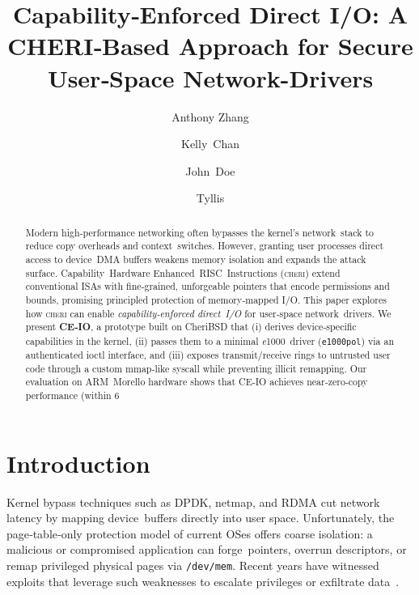 \documentclass[sigconf]{acmart}
\title{Capability‑Enforced Direct I/O: A CHERI‑Based Approach for Secure User‑Space Network-Drivers}
\author{Anthony Zhang}
\affiliation{\institution{Northwestern University}\country{USA}}
\author{Kelly Chan}
\affiliation{\institution{Northwestern University}\country{USA}}
\author{John Doe}
\affiliation{\institution{Northwestern University}\country{USA}}
\author{Tyllis}
\affiliation{\institution{Northwestern University}\country{USA}}
\newcommand{\cheri}{\textsc{cheri}\xspace}
\newcommand{\e}{\textit{e}1000\xspace}
\begin{document}
\begin{abstract}
Modern high‑performance networking often bypasses the kernel’s network stack to reduce copy overheads and context switches. However, granting user processes direct access to device DMA buffers weakens memory isolation and expands the attack surface. Capability Hardware Enhanced RISC Instructions (\cheri) extend conventional ISAs with fine‑grained, unforgeable pointers that encode permissions and bounds, promising principled protection of memory‑mapped I/O. This paper explores how \cheri can enable \emph{capability‑enforced direct I/O} for user‑space network drivers.
We present \textbf{CE‑IO}, a prototype built on CheriBSD that (i) derives device‑specific capabilities in the kernel, (ii) passes them to a minimal \e driver (\texttt{e1000pol}) via an authenticated ioctl interface, and (iii) exposes transmit/receive rings to untrusted user code through a custom mmap‑like syscall while preventing illicit remapping. Our evaluation on ARM Morello hardware shows that CE‑IO achieves near‑zero‑copy performance (within 6 %
\end{abstract}



\newpage
\maketitle
\tableofcontents







\section{Introduction}
\label{sec:intro}
Kernel bypass techniques such as DPDK, netmap, and RDMA cut network latency by mapping device buffers directly into user space. Unfortunately, the page‑table‑only protection model of current OSes offers coarse isolation: a malicious or compromised application can forge pointers, overrun descriptors, or remap privileged physical pages via \texttt{/dev/mem}. Recent years have witnessed exploits that leverage such weaknesses to escalate privileges or exfiltrate data \cite{netmapCVE}.  
\end{document}
